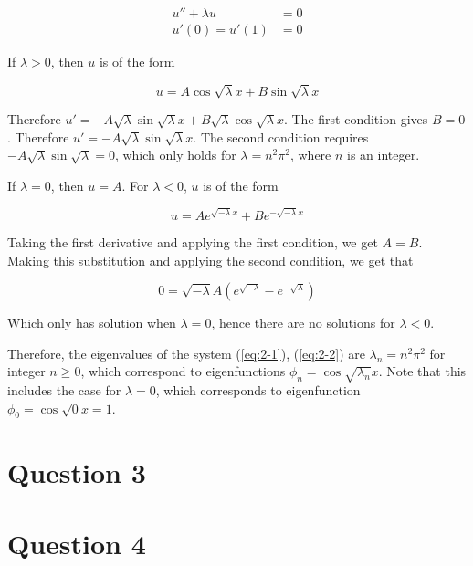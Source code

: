 \documentclass{article}
\begin{document}
\begin{align}
    u'' + \lambda u &= 0 \label{eq:2-1}\\
    u'(0) = u'(1) &= 0 \label{eq:2-2}
\end{align}

If $\lambda > 0$, then $u$ is of the form

\begin{equation*}
    u = A\cos\sqrt{\lambda}x + B\sin\sqrt{\lambda}x
\end{equation*}

Therefore $u' = -A\sqrt{\lambda}\sin\sqrt{\lambda}x + B\sqrt{\lambda}\cos\sqrt{\lambda}x$.
The first condition gives $B = 0$. Therefore $u' = -A\sqrt{\lambda}\sin\sqrt{\lambda}x$. The
second condition requires $-A\sqrt{\lambda}\sin\sqrt{\lambda} = 0$, which only holds for
$\lambda = n^2\pi^2$, where $n$ is an integer.

\hfill\break
If $\lambda = 0$, then $u = A$. For $\lambda < 0$, $u$ is of the form

\begin{equation*}
    u = Ae^{\sqrt{-\lambda}x} + Be^{-\sqrt{-\lambda}x}
\end{equation*}

Taking the first derivative and applying the first condition, we get $A = B$.
Making this substitution and applying the second condition, we get that

\begin{equation*}
    0 = \sqrt{-\lambda}A(e^{\sqrt{-\lambda}} - e^{-\sqrt{\lambda}})
\end{equation*}

Which only has solution when $\lambda = 0$, hence there are no solutions for $\lambda < 0$.

\hfill\break
Therefore, the eigenvalues of the system (\ref{eq:2-1}), (\ref{eq:2-2}) are
$\lambda_n = n^2\pi^2$ for integer $n \geq 0$, which correspond to eigenfunctions
$\phi_n = \cos\sqrt{\lambda_n}x$. Note that this includes the case for $\lambda = 0$, which
corresponds to eigenfunction $\phi_0 = \cos\sqrt{0}x = 1$.

\section*{Question 3}

\section*{Question 4}
\end{document}
